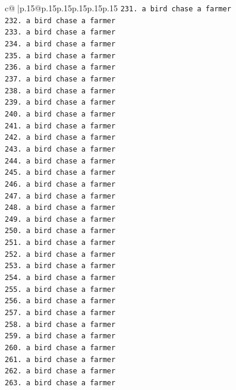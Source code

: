 \documentclass{article}
\begin{document}
{\begin{supertabular}{c@{$\;$}|p{.15\linewidth}@{}p{.15\linewidth}p{.15\linewidth}p{.15\linewidth}p{.15\linewidth}p{.15\linewidth}}
{{{\texttt{231. a bird chase a farmer} \\
\texttt{232. a bird chase a farmer} \\
\texttt{233. a bird chase a farmer} \\
\texttt{234. a bird chase a farmer} \\
\texttt{235. a bird chase a farmer} \\
\texttt{236. a bird chase a farmer} \\
\texttt{237. a bird chase a farmer} \\
\texttt{238. a bird chase a farmer} \\
\texttt{239. a bird chase a farmer} \\
\texttt{240. a bird chase a farmer} \\
\texttt{241. a bird chase a farmer} \\
\texttt{242. a bird chase a farmer} \\
\texttt{243. a bird chase a farmer} \\
\texttt{244. a bird chase a farmer} \\
\texttt{245. a bird chase a farmer} \\
\texttt{246. a bird chase a farmer} \\
\texttt{247. a bird chase a farmer} \\
\texttt{248. a bird chase a farmer} \\
\texttt{249. a bird chase a farmer} \\
\texttt{250. a bird chase a farmer} \\
\texttt{251. a bird chase a farmer} \\
\texttt{252. a bird chase a farmer} \\
\texttt{253. a bird chase a farmer} \\
\texttt{254. a bird chase a farmer} \\
\texttt{255. a bird chase a farmer} \\
\texttt{256. a bird chase a farmer} \\
\texttt{257. a bird chase a farmer} \\
\texttt{258. a bird chase a farmer} \\
\texttt{259. a bird chase a farmer} \\
\texttt{260. a bird chase a farmer} \\
\texttt{261. a bird chase a farmer} \\
\texttt{262. a bird chase a farmer} \\
\texttt{263. a bird chase a farmer} \\
}}}
\end{supertabular}}
\end{document}
